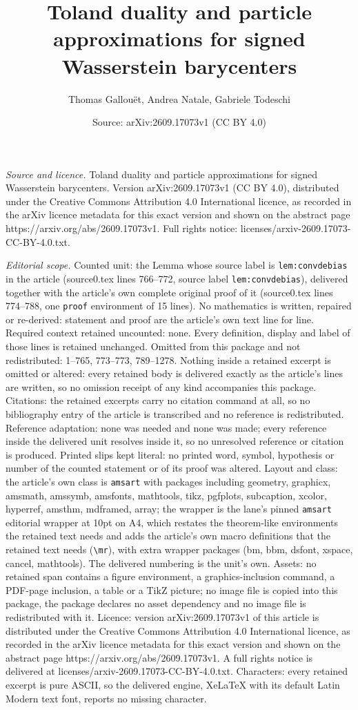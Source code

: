 \documentclass[10pt,a4paper]{amsart}
\title[Toland duality and particle approximations for signed Wasser]{Toland duality and particle approximations for signed Wasserstein barycenters}
\author{Thomas Gallou\"et, Andrea Natale, Gabriele Todeschi}
\date{Source: arXiv:2609.17073v1 (CC BY 4.0)}
\begin{document}
\maketitle

\noindent\emph{Source and licence.} Toland duality and particle approximations for signed Wasserstein barycenters. Version arXiv:2609.17073v1 (CC BY 4.0), distributed under the Creative Commons Attribution 4.0 International licence, as recorded in the arXiv licence metadata for this exact version and shown on the abstract page https://arxiv.org/abs/2609.17073v1. Full rights notice: licenses/arxiv-2609.17073-CC-BY-4.0.txt.\par\smallskip

\noindent\textit{Editorial scope.} Counted unit: the Lemma whose source label is \texttt{lem:convdebias} in the article (source0.tex lines 766--772, source label \texttt{lem:convdebias}), delivered together with the article's own complete original proof of it (source0.tex lines 774--788, one \texttt{proof} environment of 15 lines). No mathematics is written, repaired or re-derived: statement and proof are the article's own text line for line. Required context retained uncounted: none. Every definition, display and label of those lines is retained unchanged. Omitted from this package and not redistributed: 1--765, 773--773, 789--1278. Nothing inside a retained excerpt is omitted or altered: every retained body is delivered exactly as the article's lines are written, so no omission receipt of any kind accompanies this package. Citations: the retained excerpts carry no citation command at all, so no bibliography entry of the article is transcribed and no reference is redistributed. Reference adaptation: none was needed and none was made; every reference inside the delivered unit resolves inside it, so no unresolved reference or citation is produced. Printed slips kept literal: no printed word, symbol, hypothesis or number of the counted statement or of its proof was altered. Layout and class: the article's own class is \texttt{amsart} with packages including geometry, graphicx, amsmath, amssymb, amsfonts, mathtools, tikz, pgfplots, subcaption, xcolor, hyperref, amsthm, mdframed, array; the wrapper is the lane's pinned \texttt{amsart} editorial wrapper at 10pt on A4, which restates the theorem-like environments the retained text needs and adds the article's own macro definitions that the retained text needs (\texttt{\textbackslash mr}), with extra wrapper packages (bm, bbm, dsfont, xspace, cancel, mathtools). The delivered numbering is the unit's own. Assets: no retained span contains a figure environment, a graphics-inclusion command, a PDF-page inclusion, a table or a TikZ picture; no image file is copied into this package, the package declares no asset dependency and no image file is redistributed with it. Licence: version arXiv:2609.17073v1 of this article is distributed under the Creative Commons Attribution 4.0 International licence, as recorded in the arXiv licence metadata for this exact version and shown on the abstract page https://arxiv.org/abs/2609.17073v1. A full rights notice is delivered at licenses/arxiv-2609.17073-CC-BY-4.0.txt. Characters: every retained excerpt is pure ASCII, so the delivered engine, XeLaTeX with its default Latin Modern text font, reports no missing character.
\end{document}
